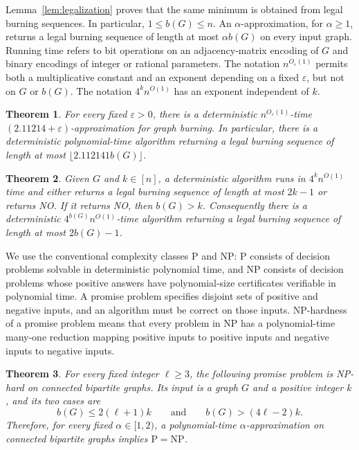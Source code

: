 \documentclass[11pt]{article}
\numberwithin{equation}{section}
\newtheorem{theorem}{Theorem}[section]
\theoremstyle{definition}
\begin{document}
Lemma~\ref{lem:legalization} proves that the same minimum is obtained
from legal burning sequences. In particular, $1\le b(G)\le n$.
An $\alpha$-approximation, for $\alpha\ge1$, returns a legal burning
sequence of length at most $\alpha b(G)$ on every input graph.
Running time refers to bit operations on an adjacency-matrix encoding of
$G$ and binary encodings of integer or rational parameters. The notation
$n^{O_\varepsilon(1)}$ permits both a multiplicative constant and an
exponent depending on a fixed $\varepsilon$, but not on $G$ or $b(G)$.
The notation $4^k n^{O(1)}$ has an exponent independent of $k$.

\begin{theorem}\label{thm:poly}
For every fixed $\varepsilon>0$, there is a deterministic
$n^{O_\varepsilon(1)}$-time $(2.11214+\varepsilon)$-approximation for
graph burning. In particular, there is a deterministic polynomial-time
algorithm returning a legal burning sequence of length at most
$\lfloor2.112141b(G)\rfloor$.
\end{theorem}

\begin{theorem}\label{thm:fpt}
Given $G$ and $k\in[n]$, a deterministic algorithm runs in
$4^k n^{O(1)}$ time and either returns a legal burning sequence of length
at most $2k-1$ or returns \textnormal{NO}. If it returns \textnormal{NO},
then $b(G)>k$. Consequently there is a deterministic
$4^{b(G)}n^{O(1)}$-time algorithm returning a legal burning sequence of
length at most $2b(G)-1$.
\end{theorem}

We use the conventional complexity classes $\mathrm P$ and $\mathrm{NP}$:
$\mathrm P$ consists of decision problems solvable in deterministic
polynomial time, and $\mathrm{NP}$ consists of decision problems whose
positive answers have polynomial-size certificates verifiable in
polynomial time. A promise problem specifies disjoint sets of positive
and negative inputs, and an algorithm must be correct on those inputs.
NP-hardness of a promise problem means that every problem in
$\mathrm{NP}$ has a polynomial-time many-one reduction mapping positive
inputs to positive inputs and negative inputs to negative inputs.

\begin{theorem}\label{thm:hardness}
For every fixed integer $\ell\ge3$, the following promise problem is
NP-hard on connected bipartite graphs. Its input is a graph $G$ and a
positive integer $k$, and its two cases are
\begin{equation}\label{eq:hardness-gap}
 b(G)\le 2(\ell+1)k
 \qquad\text{and}\qquad
 b(G)>(4\ell-2)k.
\end{equation}
Therefore, for every fixed $\alpha\in[1,2)$, a polynomial-time
$\alpha$-approximation on connected bipartite graphs implies
$\mathrm P=\mathrm{NP}$.
\end{theorem}
\end{document}
